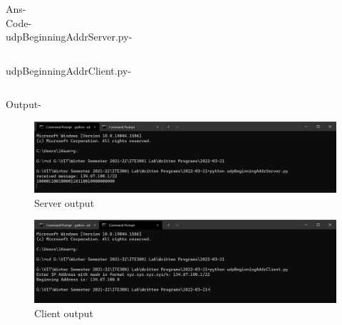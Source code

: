\documentclass[12pt]{article}
\begin{document}
Ans- \\ Code- \\ udpBeginningAddrServer.py-\inputminted{python}{udpBeginningAddrServer.py}
udpBeginningAddrClient.py- \inputminted{python}{udpBeginningAddrClient.py}
\newpage
Output-
\begin{figure}[h] %
\centering
\includegraphics[width=\textwidth]{udpBeginningAddrServer.py.png}
\caption{Server output}
\end{figure}
\begin{figure}[h] %
\centering
\includegraphics[width=\textwidth]{udpBeginningAddrClient.py.png}
\caption{Client output}
\end{figure}
\newpage
\end{document}
